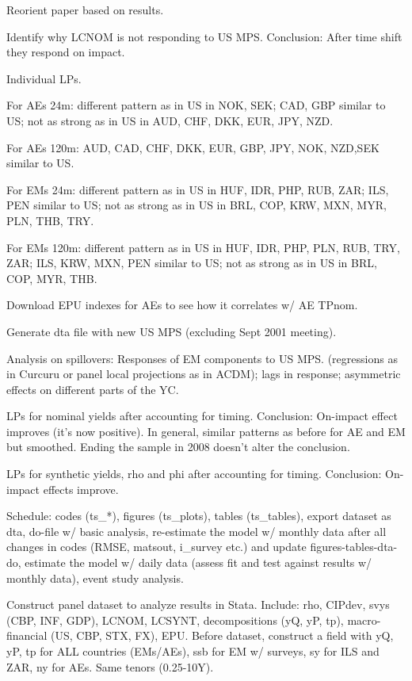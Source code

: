 \documentclass[12pt]{article}
\newcommand{\cmark}{\ding{51}}
\newcommand{\done}{\rlap{$\square$}{\raisebox{2pt}{\large\hspace{1pt}\cmark}}%
	\hspace{-2.5pt}}
\begin{document}
\begin{todolist}
	\item[\done] Reorient paper based on results.
	\item[\done] Identify why LCNOM is not responding to US MPS. Conclusion: After time shift they respond on impact.
	\item[\done] Individual LPs.
	\begin{todolist}
		\item For AEs 24m: different pattern as in US in NOK, SEK; CAD, GBP similar to US; not as strong as in US in AUD, CHF, DKK, EUR, JPY, NZD.
		\item For AEs 120m: AUD, CAD, CHF, DKK, EUR, GBP, JPY, NOK, NZD,SEK similar to US.
		\item For EMs 24m: different pattern as in US in HUF, IDR, PHP, RUB, ZAR; ILS, PEN similar to US; not as strong as in US in BRL, COP, KRW, MXN, MYR, PLN, THB, TRY.
		\item For EMs 120m: different pattern as in US in HUF, IDR, PHP, PLN, RUB, TRY, ZAR; ILS, KRW, MXN, PEN similar to US; not as strong as in US in BRL, COP, MYR, THB.
	\end{todolist}
	\item[\done] Download EPU indexes for AEs to see how it correlates w/ AE TPnom.
	\item[\done] Generate dta file with new US MPS (excluding Sept 2001 meeting).
	\item[\done] Analysis on spillovers: Responses of EM components to US MPS. (regressions as in Curcuru or panel local projections as in ACDM); lags in response; asymmetric effects on different parts of the YC.
	\item[\done] LPs for nominal yields after accounting for timing. Conclusion: On-impact effect improves (it's now positive). In general, similar patterns as before for AE and EM but smoothed. Ending the sample in 2008 doesn't alter the conclusion.
	\item[\done] LPs for synthetic yields, rho and phi after accounting for timing. Conclusion: On-impact effects improve.
	\item[\done] Schedule: codes (ts_*), figures (ts_plots), tables (ts_tables), export dataset as dta, do-file w/ basic analysis, re-estimate the model w/ monthly data after all changes in codes (RMSE, matsout, i_survey etc.) and update figures-tables-dta-do, estimate the model w/ daily data (assess fit and test against results w/ monthly data), event study analysis.
	\item[\done] Construct panel dataset to analyze results in Stata. Include: rho, CIPdev, svys (CBP, INF, GDP), LCNOM, LCSYNT, decompositions (yQ, yP, tp), macro-financial (US, CBP, STX, FX), EPU. Before dataset, construct a field with yQ, yP, tp for ALL countries (EMs/AEs), ssb for EM w/ surveys, sy for ILS and ZAR, ny for AEs. Same tenors (0.25-10Y).

\end{todolist}
\end{document}
